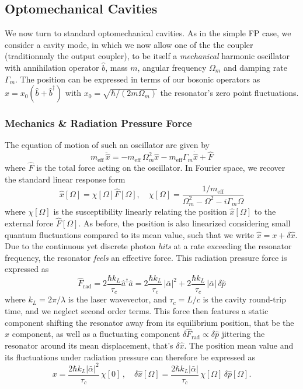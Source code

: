 \subsection{Optomechanical Cavities}
We now turn to standard optomechanical cavities. As in the simple FP case, we consider a cavity mode, in which we now allow one of the the coupler (traditionnaly the output coupler), to be itself a \textit{mechanical} harmonic oscillator with annihilation operator $\hat{b}$, mass $m$, angular frequency $\Omega_m$ and damping rate $\Gamma_m$. The position can be expressed in terms of our bosonic operators as  $\hat{x}=x_0(\hat{b}+\hat{b}^{\dagger})$ with $x_0 = \sqrt{\hbar/(2m\Omega_m)}$ the resonator's zero point fluctuations. 

\subsubsection{Mechanics \& Radiation Pressure Force }
The equation of motion of such an oscillator are given by 
\begin{equation}
  m_{\text{eff}} \, \ddot{\hat x} = -m_{\text{eff}} \, \Omega_m^2 \hat x - m_{\text{eff}} \Gamma_m \dot{\hat x} + \hat F
\end{equation}
where $\hat F$ is the total force acting on the oscillator.
In Fourier space, we recover the standard linear response form
\begin{equation}
  \hat x [\Omega] = \chi[\Omega] \hat F[\Omega], \quad \chi[\Omega] = \frac{1/m_{\text{eff}}}{\Omega_m^2 - \Omega^2 - i \Gamma_m \Omega}
\end{equation}
where $\chi[\Omega]$ is the susceptibility linearly relating the position $\hat x [\Omega]$ to the external force $\hat F[\Omega]$. As before, the position is also linearized considering small quantum fluctuations compared to its mean value, such that we write $\hat{x}= x + \delta \hat{x}$. Due to the continuous yet discrete photon \textit{hits} at a rate exceeding the resonator frequency, the resonator \textit{feels} an effective force. This radiation pressure force is expressed as 
\begin{equation}
  \hat F_{\textrm{rad}} = 2 \frac{\hbar k_L}{\tau_c}\hat{a}^\dagger \hat{a} = 2 \frac{\hbar k_L}{\tau_c} \, |\bar{\alpha}|^2 +2 \frac{\hbar k_L}{\tau_c} \, |\bar \alpha| \, \delta \hat{p}
\end{equation}
where $k_L = 2\pi / \lambda$ is the laser wavevector, and $\tau_c=L/c$ is the cavity round-trip time, and we neglect second order terms. This force then features a static component shifting the resonator away from its equilibrium position, that be the $x$ component, as well as a fluctuating component $\delta \hat F_{\mathrm{rad}}\propto \delta \hat{p}$ jittering the resonator around its mean displacement, that's $\delta \hat x$. The position mean value and its fluctuations under radiation pressure can therefore be expressed as 
\begin{equation}
  x = \frac{2\hbar k_L |\bar \alpha|^2}{\tau_c}  \,  \chi[0] \, , \quad \delta \hat x [\Omega]= \frac{2\hbar k_L |\bar \alpha|}{\tau_c}  \,  \chi[\Omega] \,  \delta \hat{p}[\Omega]. 
\end{equation} 
